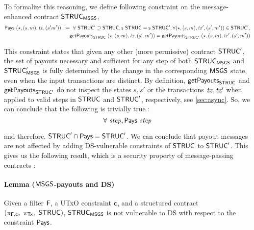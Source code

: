 To formalize this reasoning, we define following constraint on the message-enhanced
contract $\mathsf{STRUC}_{\mathsf{MSGS}}$,
\begin{align*}
  \mathsf{Pays}~(\star, (s, m), \mathit{tx}, (s' m'))~\mathrel{\mathop:}=~\forall~\mathsf{STRUC}' \supseteq \mathsf{STRUC},
  \mathsf{s}~\mathsf{STRUC} = \mathsf{s}~\mathsf{STRUC}',
  \forall (\star, (s, m), \mathit{tx'}, (s', m')) \in \mathsf{STRUC}', \\
  ~~~~\mathsf{getPayouts}_{\mathsf{STRUC}}~(\star, (s, m), \mathit{tx}, (s', m')) = \mathsf{getPayouts}_{\mathsf{STRUC}'}~(\star, (s, m), \mathit{tx'}, (s', m'))
\end{align*}

This constraint states that given any other (more permissive) contract $\mathsf{STRUC}'$,
the set of payouts necessary and sufficient for any step of both $\mathsf{STRUC}_{\mathsf{MSGS}}$ and
$\mathsf{STRUC}'_{\mathsf{MSGS}}$ is fully determined by the change in the corresponding $\mathsf{MSGS}$ state,
even when the input transactions are distinct.
By definition, $\mathsf{getPayouts}_{\mathsf{STRUC}}$ and
$\mathsf{getPayouts}_{\mathsf{STRUC}'}$ do not inspect the states $s, s'$ or the
transactions $\mathit{tx}, \mathit{tx'}$ when applied to valid steps in $\mathsf{STRUC}$
and $\mathsf{STRUC}'$, respectively, see \ref{sec:async}.
So, we can conclude that the following is trivially true :
\[ \forall ~\mathit{step}, \mathsf{Pays}~\mathit{step} \]

and therefore, $\mathsf{STRUC}' \cap \mathsf{Pays} = \mathsf{STRUC}'$. We can conclude that payout
messages are not affected
by adding DS-vulnerable constraints of $\mathsf{STRUC}$ to $\mathsf{STRUC}'$.
This gives us the following result, which is a security property
of message-passing contracts :

\paragraph{Lemma ($\mathsf{MSGS}$-payouts and DS)}
Given a filter $\mathsf{F}$, a UTxO constraint $\mathsf{c}$, and a structured contract
$(\pi_{\mathsf{F,c}},~\pi_{\mathsf{Tx}},~\mathsf{STRUC})$, $\mathsf{STRUC}_{\mathsf{MSGS}}$ is not vulnerable to
DS with respect to the constraint $\mathsf{Pays}$.
